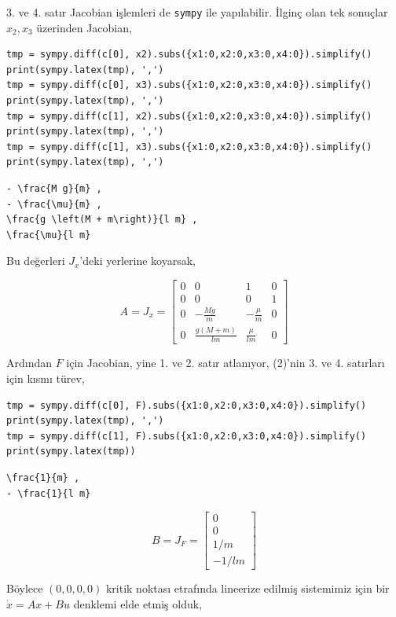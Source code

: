 \documentclass[12pt,fleqn]{article}\usepackage{../../common}
\begin{document}
3. ve 4. satır Jacobian işlemleri de \verb!sympy! ile yapılabilir. İlginç
olan tek sonuçlar $x_2,x_3$ üzerinden Jacobian,

\begin{verbatim}
tmp = sympy.diff(c[0], x2).subs({x1:0,x2:0,x3:0,x4:0}).simplify()
print(sympy.latex(tmp), ',')
tmp = sympy.diff(c[0], x3).subs({x1:0,x2:0,x3:0,x4:0}).simplify()
print(sympy.latex(tmp), ',')
tmp = sympy.diff(c[1], x2).subs({x1:0,x2:0,x3:0,x4:0}).simplify()
print(sympy.latex(tmp), ',')
tmp = sympy.diff(c[1], x3).subs({x1:0,x2:0,x3:0,x4:0}).simplify()
print(sympy.latex(tmp), ',')
\end{verbatim}

\begin{verbatim}
- \frac{M g}{m} ,
- \frac{\mu}{m} ,
\frac{g \left(M + m\right)}{l m} ,
\frac{\mu}{l m}
\end{verbatim}

Bu değerleri $J_x$'deki yerlerine koyarsak,

$$
A = J_x = \left[\begin{array}{cccc}
0 & 0 & 1 & 0 \\
0 & 0 & 0 & 1 \\
0 & - \frac{M g}{m} & - \frac{\mu}{m} & 0 \\ 
0 & \frac{g \left(M + m\right)}{l m}  & \frac{\mu}{l m}  & 0
\end{array}\right]
$$

Ardından $F$ için Jacobian, yine 1. ve 2. satır atlanıyor, (2)'nin 3. ve
4. satırları için kısmı türev,

\begin{verbatim}
tmp = sympy.diff(c[0], F).subs({x1:0,x2:0,x3:0,x4:0}).simplify()
print(sympy.latex(tmp), ',')
tmp = sympy.diff(c[1], F).subs({x1:0,x2:0,x3:0,x4:0}).simplify()
print(sympy.latex(tmp))
\end{verbatim}

\begin{verbatim}
\frac{1}{m} ,
- \frac{1}{l m}
\end{verbatim}

$$
B = J_F = \left[\begin{array}{c}
0 \\
0 \\
1/m \\
- 1 / lm
\end{array}\right]
$$

Böylece $(0,0,0,0)$ kritik noktası etrafında lineerize edilmiş sistemimiz
için bir $\dot{x} = A x + B u$ denklemi elde etmiş olduk, 
\end{document}
